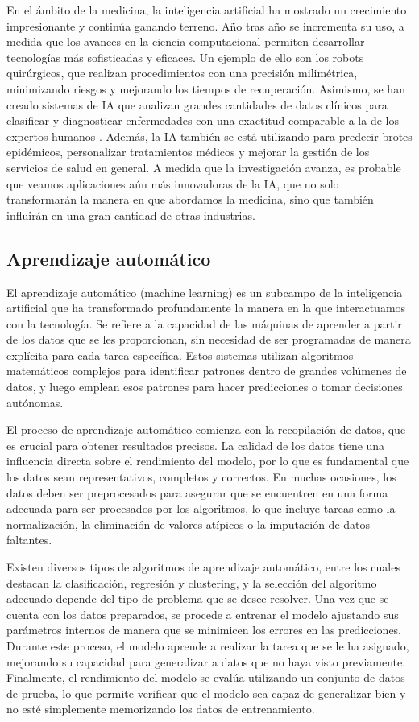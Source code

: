 En el ámbito de la medicina, la inteligencia artificial ha mostrado un crecimiento
impresionante y continúa ganando terreno. Año tras año se incrementa su uso, a medida que
los avances en la ciencia computacional permiten desarrollar tecnologías más sofisticadas
y eficaces. Un ejemplo de ello son los robots quirúrgicos, que realizan procedimientos
con una precisión milimétrica, minimizando riesgos y mejorando los tiempos de
recuperación. Asimismo, se han creado sistemas de IA que analizan grandes cantidades de
datos clínicos para clasificar y diagnosticar enfermedades con una exactitud comparable a
la de los expertos humanos . Además, la IA también se
está utilizando para predecir brotes epidémicos, personalizar tratamientos médicos y
mejorar la gestión de los servicios de salud en general. A medida que la investigación
avanza, es probable que veamos aplicaciones aún más innovadoras de la IA, que no solo
transformarán la manera en que abordamos la medicina, sino que también influirán en una
gran cantidad de otras industrias.

\subsection{Aprendizaje automático}

El aprendizaje automático (machine learning) es un subcampo de la inteligencia artificial
que ha transformado profundamente la manera en la que interactuamos con la tecnología. Se
refiere a la capacidad de las máquinas de aprender a partir de los datos que se les
proporcionan, sin necesidad de ser programadas de manera explícita para cada tarea
específica. Estos sistemas utilizan algoritmos matemáticos complejos para identificar
patrones dentro de grandes volúmenes de datos, y luego emplean esos patrones para hacer
predicciones o tomar decisiones autónomas.

El proceso de aprendizaje automático comienza con la recopilación de datos, que es
crucial para obtener resultados precisos. La calidad de los datos tiene una influencia
directa sobre el rendimiento del modelo, por lo que es fundamental que los datos sean
representativos, completos y correctos. En muchas ocasiones, los datos deben ser
preprocesados para asegurar que se encuentren en una forma adecuada para ser procesados
por los algoritmos, lo que incluye tareas como la normalización, la eliminación de
valores atípicos o la imputación de datos faltantes.

Existen diversos tipos de algoritmos de aprendizaje automático, entre los cuales destacan
la clasificación, regresión y clustering, y la selección del algoritmo adecuado depende
del tipo de problema que se desee resolver. Una vez que se cuenta con los datos
preparados, se procede a entrenar el modelo ajustando sus parámetros internos de manera
que se minimicen los errores en las predicciones. Durante este proceso, el modelo aprende
a realizar la tarea que se le ha asignado, mejorando su capacidad para generalizar a
datos que no haya visto previamente. Finalmente, el rendimiento del modelo se evalúa
utilizando un conjunto de datos de prueba, lo que permite verificar que el modelo sea
capaz de generalizar bien y no esté simplemente memorizando los datos de entrenamiento.

